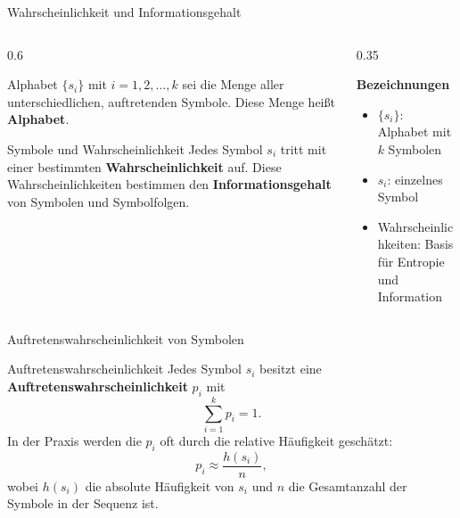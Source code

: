 \begin{frame}{Wahrscheinlichkeit und Informationsgehalt}

\begin{columns}[T]

\begin{column}{0.6\textwidth}

\begin{blockDef}{Alphabet}
\(\{s_i\}\) mit \(i = 1, 2, \dots, k\) sei die Menge aller unterschiedlichen,
auftretenden Symbole.  
Diese Menge heißt \textbf{Alphabet}.
\end{blockDef}

\begin{block}{Symbole und Wahrscheinlichkeit}
Jedes Symbol \(s_i\) tritt mit einer bestimmten \textbf{Wahrscheinlichkeit} auf.  
Diese Wahrscheinlichkeiten bestimmen den \textbf{Informationsgehalt} von Symbolen
und Symbolfolgen.
\end{block}

\end{column}

\begin{column}{0.35\textwidth}

\textbf{Bezeichnungen}

\begin{itemize}
  \item \(\{s_i\}\): Alphabet mit \(k\) Symbolen
  \item \(s_i\): einzelnes Symbol
  \item Wahrscheinlichkeiten: Basis für Entropie und Information
\end{itemize}

\end{column}

\end{columns}
\end{frame}

\begin{frame}{Auftretenswahrscheinlichkeit von Symbolen}

\begin{blockDef}{Auftretenswahrscheinlichkeit}
Jedes Symbol \(s_i\) besitzt eine \textbf{Auftretenswahrscheinlichkeit} \(p_i\) mit
\[
\sum_{i=1}^{k} p_i = 1.
\]
In der Praxis werden die \(p_i\) oft durch die relative Häufigkeit geschätzt:
\[
p_i \approx \frac{h(s_i)}{n},
\]
wobei \(h(s_i)\) die absolute Häufigkeit von \(s_i\) und \(n\) die Gesamtanzahl
der Symbole in der Sequenz ist.
\end{blockDef}

\end{frame}

